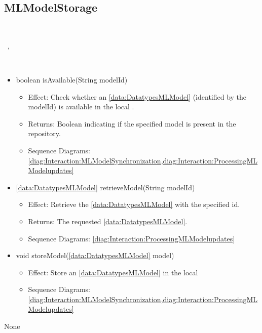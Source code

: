   \subsection{MLModelStorage}\label{int:InterfacesMLModelStorage}
    \begin{description}
      \item[Provided by:] \iconcomponent{}~
      \item[Required by:] \iconcomponent{}~, \iconcomponent{}~ 
      \item[Operations:] ~
    \begin{itemize}[noitemsep,nolistsep,leftmargin=-.25cm]
      \item \textsf{boolean isAvailable(String modelId)}
        \begin{itemize}[noitemsep,nolistsep]
           \item Effect: Check whether an \ref{data:DatatypesMLModel} (identified by the modelId) is available in the local . 
           \item Returns: Boolean indicating if the specified model is present in the repository.
           \item Sequence Diagrams: \cref{diag:Interaction:MLModelSynchronization,diag:Interaction:ProcessingMLModelupdates}
        \end{itemize}
      \item \textsf{\ref{data:DatatypesMLModel} retrieveModel(String modelId)}
        \begin{itemize}[noitemsep,nolistsep]
           \item Effect: Retrieve the \ref{data:DatatypesMLModel} with the specified id. 
           \item Returns: The requested \ref{data:DatatypesMLModel}.
           \item Sequence Diagrams: \cref{diag:Interaction:ProcessingMLModelupdates}
        \end{itemize}
      \item \textsf{void storeModel(\ref{data:DatatypesMLModel} model)}
        \begin{itemize}[noitemsep,nolistsep]
           \item Effect: Store an \ref{data:DatatypesMLModel} in the local  
           \item Sequence Diagrams: \cref{diag:Interaction:MLModelSynchronization,diag:Interaction:ProcessingMLModelupdates}
        \end{itemize}
    \end{itemize}
      \item[Diagrams:] None
    \end{description}

